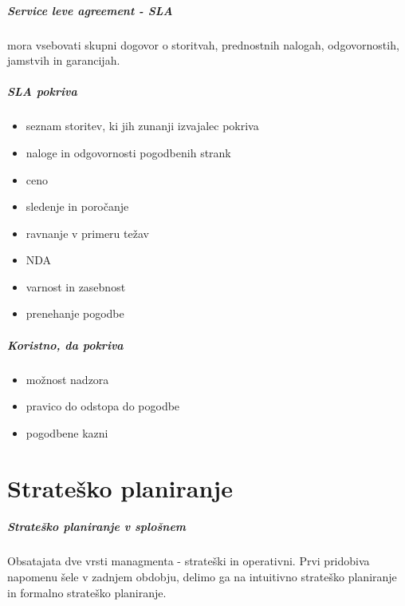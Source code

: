 \documentclass[a4paper,12pt]{report}
\begin{document}
         \paragraph{Service leve agreement - SLA} mora vsebovati skupni dogovor o storitvah, prednostnih nalogah, odgovornostih, jamstvih in garancijah.
         \paragraph{SLA pokriva}
            \begin{itemize}
               \item seznam storitev, ki jih zunanji izvajalec pokriva
               \item naloge in odgovornosti pogodbenih strank
               \item ceno
               \item sledenje in poročanje
               \item ravnanje v primeru težav
               \item NDA
               \item varnost in zasebnost
               \item prenehanje pogodbe
            \end{itemize}
         \paragraph{Koristno, da pokriva}
            \begin{itemize}
               \item možnost nadzora
               \item pravico do odstopa do pogodbe
               \item pogodbene kazni
            \end{itemize}


\chapter{Strateško planiranje}
   \paragraph{Strateško planiranje v splošnem} Obsatajata dve vrsti managmenta - strateški in operativni. Prvi pridobiva napomenu šele v zadnjem obdobju, delimo ga na intuitivno strateško planiranje in formalno strateško planiranje.
\end{document}
